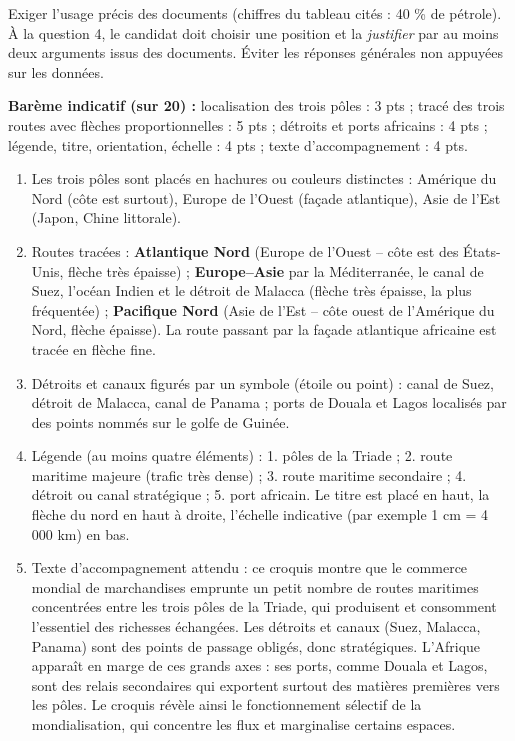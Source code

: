 \documentclass[11pt]{article}
\begin{document}
\begin{attention}
Exiger l'usage précis des documents (chiffres du tableau cités : 40 \% de pétrole). À la question 4, le candidat doit choisir une position et la \emph{justifier} par au moins deux arguments issus des documents. Éviter les réponses générales non appuyées sur les données.
\end{attention}

\begin{corrige}
\textbf{Barème indicatif (sur 20) :} localisation des trois pôles : 3 pts ; tracé des trois routes avec flèches proportionnelles : 5 pts ; détroits et ports africains : 4 pts ; légende, titre, orientation, échelle : 4 pts ; texte d'accompagnement : 4 pts.
\begin{enumerate}
\item Les trois pôles sont placés en hachures ou couleurs distinctes : Amérique du Nord (côte est surtout), Europe de l'Ouest (façade atlantique), Asie de l'Est (Japon, Chine littorale).
\item Routes tracées : \textbf{Atlantique Nord} (Europe de l'Ouest -- côte est des États-Unis, flèche très épaisse) ; \textbf{Europe--Asie} par la Méditerranée, le canal de Suez, l'océan Indien et le détroit de Malacca (flèche très épaisse, la plus fréquentée) ; \textbf{Pacifique Nord} (Asie de l'Est -- côte ouest de l'Amérique du Nord, flèche épaisse). La route passant par la façade atlantique africaine est tracée en flèche fine.
\item Détroits et canaux figurés par un symbole (étoile ou point) : canal de Suez, détroit de Malacca, canal de Panama ; ports de Douala et Lagos localisés par des points nommés sur le golfe de Guinée.
\item Légende (au moins quatre éléments) : 1. pôles de la Triade ; 2. route maritime majeure (trafic très dense) ; 3. route maritime secondaire ; 4. détroit ou canal stratégique ; 5. port africain. Le titre est placé en haut, la flèche du nord en haut à droite, l'échelle indicative (par exemple 1 cm = 4 000 km) en bas.
\item Texte d'accompagnement attendu : ce croquis montre que le commerce mondial de marchandises emprunte un petit nombre de routes maritimes concentrées entre les trois pôles de la Triade, qui produisent et consomment l'essentiel des richesses échangées. Les détroits et canaux (Suez, Malacca, Panama) sont des points de passage obligés, donc stratégiques. L'Afrique apparaît en marge de ces grands axes : ses ports, comme Douala et Lagos, sont des relais secondaires qui exportent surtout des matières premières vers les pôles. Le croquis révèle ainsi le fonctionnement sélectif de la mondialisation, qui concentre les flux et marginalise certains espaces.
\end{enumerate}
\end{corrige}
\end{document}
